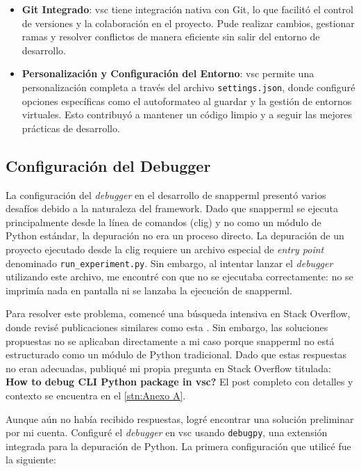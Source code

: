 \begin{itemize}
    \item \textbf{Git Integrado}: \acrshort{vsc} tiene integración nativa con Git, lo que facilitó el control de versiones y la colaboración en el proyecto. Pude realizar cambios, gestionar ramas y resolver conflictos de manera eficiente sin salir del entorno de desarrollo.

    \item \textbf{Personalización y Configuración del Entorno}: \acrshort{vsc} permite una personalización completa a través del archivo \texttt{settings.json}, donde configuré opciones específicas como el autoformateo al guardar y la gestión de entornos virtuales. Esto contribuyó a mantener un código limpio y a seguir las mejores prácticas de desarrollo.
\end{itemize}



\subsection{Configuración del Debugger}

La configuración del \textit{debugger} en el desarrollo de \Gls{snapperml} presentó varios desafíos debido a la naturaleza del framework. Dado que \Gls{snapperml} se ejecuta principalmente desde la línea de comandos (\Gls{clig}) y no como un módulo de Python estándar, la depuración no era un proceso directo. La depuración de un proyecto ejecutado desde la \Gls{clig} requiere un archivo especial de \textit{entry point} denominado \texttt{run\_experiment.py}. Sin embargo, al intentar lanzar el \textit{debugger} utilizando este archivo, me encontré con que no se ejecutaba correctamente: no se imprimía nada en pantalla ni se lanzaba la ejecución de \Gls{snapperml}.

Para resolver este problema, comencé una búsqueda intensiva en Stack Overflow, donde revisé publicaciones similares como esta \cite{stackoverflow_modules}. Sin embargo, las soluciones propuestas no se aplicaban directamente a mi caso porque \Gls{snapperml} no está estructurado como un módulo de Python tradicional. Dado que estas respuestas no eran adecuadas, publiqué mi propia pregunta en Stack Overflow titulada: \textbf{How to debug CLI Python package in \acrshort{vsc}?} El post completo con detalles y contexto se encuentra en el \ref{stn:Anexo A}.

Aunque aún no había recibido respuestas, logré encontrar una solución preliminar por mi cuenta. Configuré el \textit{debugger} en \acrfull{vsc} usando \texttt{debugpy}, una extensión integrada para la depuración de Python. La primera configuración que utilicé fue la siguiente:

